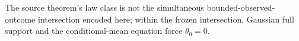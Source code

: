 The source theorem's law class is not the simultaneous bounded-observed-outcome intersection encoded here; within the frozen intersection, Gaussian full support and the conditional-mean equation force \(\theta_0=0\).